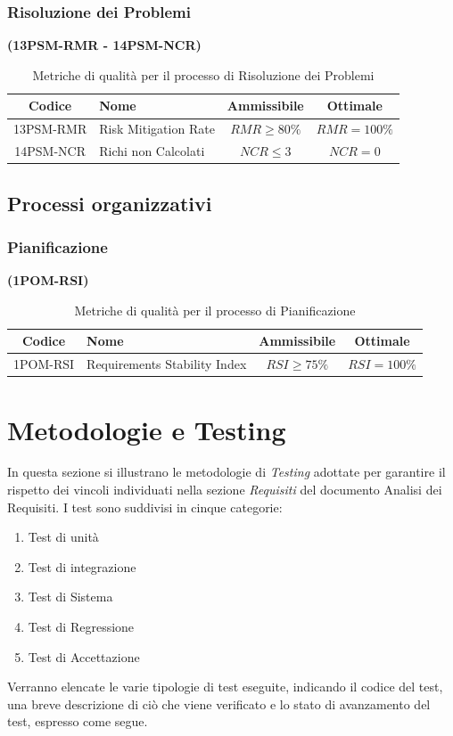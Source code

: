 \documentclass{article}
\begin{document}
\subsubsection{Risoluzione dei Problemi}%
\textbf{(13PSM-RMR - 14PSM-NCR)}
\begin{table}[H]
    \centering
    \renewcommand{\arraystretch}{1.5} %
    \begin{tabular}{|c|l|c|c|}
        \hline
        \textbf{Codice} & \textbf{Nome} & \textbf{Ammissibile} & \textbf{Ottimale} \\
        \hline
        13PSM-RMR & Risk Mitigation Rate & $RMR \geq 80\%$ & $RMR = 100\%$ \\
        14PSM-NCR & Richi non Calcolati & $NCR \leq 3$ & $NCR = 0$ \\
        \hline
    \end{tabular}
    \label{tab:risoluzione_problemi}
    \caption{Metriche di qualità per il processo di Risoluzione dei Problemi}
\end{table}
\subsection{Processi organizzativi}
\subsubsection{Pianificazione} %
\textbf{(1POM-RSI)}
\begin{table}[H]
    \centering
    \renewcommand{\arraystretch}{1.5} %
    \begin{tabular}{|c|l|c|c|}
        \hline
        \textbf{Codice} & \textbf{Nome} & \textbf{Ammissibile} & \textbf{Ottimale} \\
        \hline
        1POM-RSI & Requirements Stability Index & $RSI \geq 75\%$ & $RSI = 100\%$ \\
        \hline
    \end{tabular}
    \label{tab:pianificazione}
    \caption{Metriche di qualità per il processo di Pianificazione}
\end{table}
\newpage
\section{Metodologie e Testing}
In questa sezione si illustrano le metodologie di \textit{Testing} adottate per garantire il rispetto dei vincoli individuati
nella sezione \textit{Requisiti} del documento Analisi dei Requisiti. I test sono suddivisi in cinque categorie:
\begin{enumerate}
    \item Test di unità
    \item Test di integrazione
    \item Test di Sistema
    \item Test di Regressione
    \item Test di Accettazione
\end{enumerate}
Verranno elencate le varie tipologie di test eseguite, indicando il codice del test, una breve descrizione di ciò che viene verificato e lo stato di avanzamento del test, espresso come segue.
\end{document}
